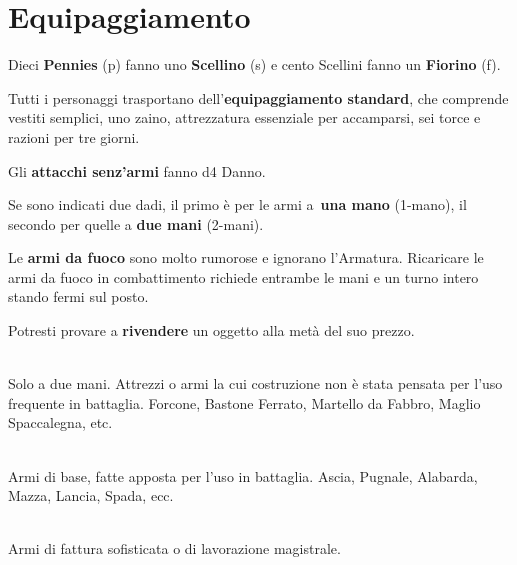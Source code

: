 \documentclass[itdr]{subfiles}
\begin{document}
\vfill
{}

\vfill
\clearpage


\section{Equipaggiamento}

Dieci \textbf{Pennies} (p) fanno uno \textbf{Scellino} (s) e cento Scellini fanno un \textbf{Fiorino} (f).

\vfill

Tutti i personaggi trasportano dell'\textbf{equipaggiamento standard}, che comprende vestiti semplici, uno zaino, attrezzatura essenziale per accamparsi, sei torce e razioni per tre giorni.

\vfill

Gli \textbf{attacchi senz’armi} fanno d4 Danno.

\vfill

Se sono indicati due dadi, il primo è per le armi a~\textbf{una mano} (1-mano), il secondo per quelle a \textbf{due mani} \mbox{(2-mani).}

\vfill

Le \textbf{armi da fuoco} sono molto rumorose e ignorano l’Armatura. Ricaricare le armi da fuoco in combattimento richiede entrambe le mani e un turno intero stando fermi sul posto.

\vfill

Potresti provare a \textbf{rivendere} un oggetto alla metà del suo prezzo.

\vfill


\\Solo a due mani. Attrezzi o armi la cui costruzione non è stata pensata per l’uso frequente in battaglia. Forcone, Bastone Ferrato, Martello da Fabbro, Maglio Spaccalegna, etc.

\\Armi di base, fatte apposta per l’uso in battaglia. Ascia, Pugnale, Alabarda, Mazza, Lancia, Spada, ecc.

\\Armi di fattura sofisticata o di lavorazione magistrale.
\end{document}
